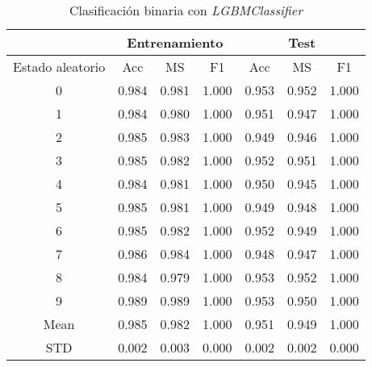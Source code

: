 \begin{table}[th]
	\centering
	\begin{tabular}{ |c|c|c|c|c|c|c| }
		\hline
		\rowcolor{LightCyan}
		 & \multicolumn{3}{c|}{Entrenamiento} & \multicolumn{3}{c|}{Test} \\
		\hline
		\rowcolor{LightCyan}
		 Estado aleatorio & Acc & MS & F1 & Acc & MS & F1 \\
		\hline
		0 & 0.984 & 0.981 & 1.000 & 0.953 & 0.952 & 1.000 \\
		1 & 0.984 & 0.980 & 1.000 & 0.951 & 0.947 & 1.000 \\
		2 & 0.985 & 0.983 & 1.000 & 0.949 & 0.946 & 1.000 \\
		3 & 0.985 & 0.982 & 1.000 & 0.952 & 0.951 & 1.000 \\
		4 & 0.984 & 0.981 & 1.000 & 0.950 & 0.945 & 1.000 \\
		5 & 0.985 & 0.981 & 1.000 & 0.949 & 0.948 & 1.000 \\
		6 & 0.985 & 0.982 & 1.000 & 0.952 & 0.949 & 1.000 \\
		7 & 0.986 & 0.984 & 1.000 & 0.948 & 0.947 & 1.000 \\
		8 & 0.984 & 0.979 & 1.000 & 0.953 & 0.952 & 1.000 \\
		9 & 0.989 & 0.989 & 1.000 & 0.953 & 0.950 & 1.000 \\
		Mean & 0.985 & 0.982 & 1.000 & 0.951 & 0.949 & 1.000 \\
		STD & 0.002 & 0.003 & 0.000 & 0.002 & 0.002 & 0.000 \\
		\hline
	\end{tabular}
	\caption{Clasificación binaria con \textit{LGBMClassifier}}
	\label{tabla:lgbm_bin}
\end{table}

